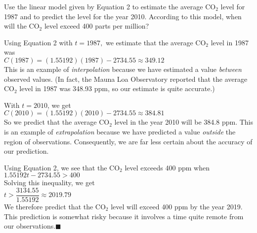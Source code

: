 \documentclass{sebase}
\begin{document}
\begin{Example}[3]
\VIDEO%
%
Use the linear model given by Equation 2 to estimate the average CO$_{2}$
level for 1987 and to predict the level for the year 2010. According to this
model, when will the CO$_{2}$ level exceed 400 parts per million?
\end{Example}

\begin{Solution}
Using Equation 2 with $t=1987,$ we estimate that the average CO$_{2}$ level
in 1987 was\\[6pt]
\hspace*{\fill}$C(1987)=(1.55192)(1987)-2734.55\approx 349.12$\hspace*{\fill}%
\\[6pt]
This is an example of \textit{interpolation} because we have estimated a
value \textit{between} observed values. (In fact, the Mauna Loa Observatory
reported that the average CO$_{2}$ level in 1987 was 348.93 ppm, so our
estimate is quite accurate.)

With $t=2010$, we get\\[6pt]
\hspace*{\fill}$C(2010)=(1.55192)(2010)-2734.55\approx 384.81$\hspace*{\fill}%
\\[6pt]
So we predict that the average CO$_{2}$ level in the year 2010 will be 384.8
ppm. This is an example of \textit{extrapolation} because we have predicted
a value \textit{outside} the region of observations. Consequently, we are
far less certain about the accuracy of our prediction.

Using Equation 2, we see that the CO$_{2}$ level exceeds 400 ppm when\\[6pt]
\hspace*{\fill}$1.55192t-2734.55>400$\hspace*{\fill}\\[6pt]
Solving this inequality, we get \\[6pt]
\hspace*{\fill}$t>\dfrac{3134.55}{1.55192}\approx 2019.79$\hspace*{\fill}\\[%
6pt]
We therefore predict that the CO$_{2}$ level will exceed 400 ppm by the year
2019. This prediction is somewhat risky because it involves a time quite
remote from our observations.$\blacksquare $
\end{Solution}
\end{document}
